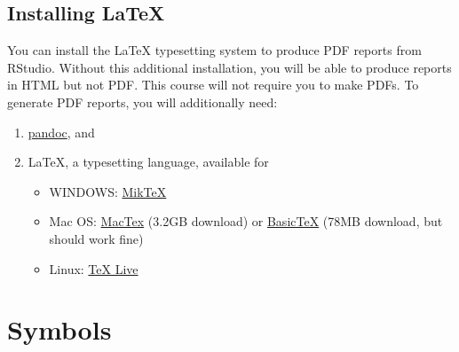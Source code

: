 \documentclass[
]{book}
\providecommand{\tightlist}{%
  \setlength{\itemsep}{0pt}\setlength{\parskip}{0pt}}
\begin{document}
\hypertarget{installing-latex}{%
\section{Installing LaTeX}\label{installing-latex}}

You can install the LaTeX typesetting system to produce PDF reports from RStudio. Without this additional installation, you will be able to produce reports in HTML but not PDF. This course will not require you to make PDFs. To generate PDF reports, you will additionally need:

\begin{enumerate}
\def\labelenumi{\arabic{enumi}.}
\tightlist
\item
  \href{http://pandoc.org/installing.html}{pandoc}, and
\item
  LaTeX, a typesetting language, available for

  \begin{itemize}
  \tightlist
  \item
    WINDOWS: \href{http://miktex.org/}{MikTeX}
  \item
    Mac OS: \href{https://tug.org/mactex/downloading.html}{MacTex} (3.2GB download) or \href{http://ww.tug.org/mactex/morepackages.html}{BasicTeX} (78MB download, but should work fine)
  \item
    Linux: \href{https://www.tug.org/texlive/}{TeX Live}
  \end{itemize}
\end{enumerate}

\hypertarget{symbols}{%
\chapter{Symbols}\label{symbols}}
\end{document}
